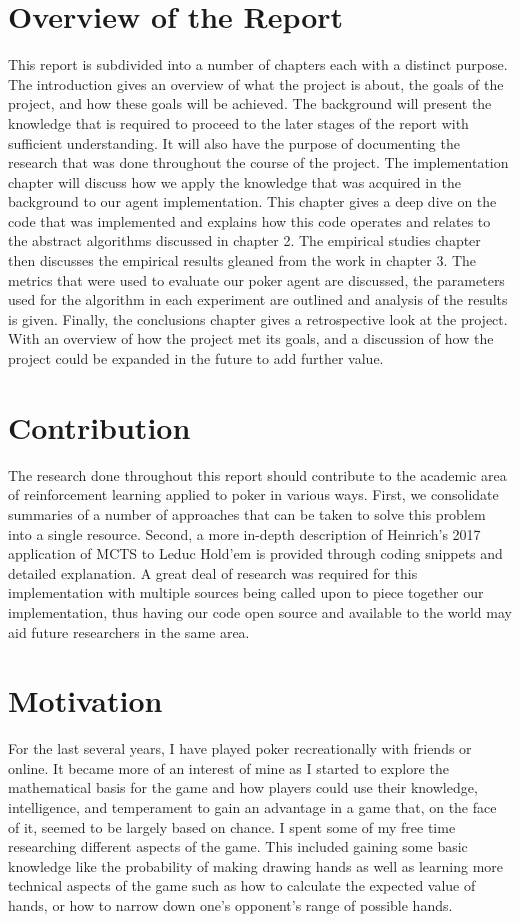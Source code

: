 \section{Overview of the Report}\label{sec:reportOverview}
This report is subdivided into a number of chapters each with a distinct purpose.
The introduction gives an overview of what the project is about, the goals of the project, and how
these goals will be achieved.
The background will present the knowledge that is required to proceed to the
later stages of the report with sufficient understanding.
It will also have the purpose of documenting the research that was done throughout the course of the project.
The implementation chapter will discuss how we apply the knowledge that was acquired in the
background to our agent implementation.
This chapter gives a deep dive on the code that was implemented and explains how this code operates
and relates to the abstract algorithms discussed in chapter 2.
The empirical studies chapter then discusses the empirical results gleaned from the work in chapter 3.
The metrics that were used to evaluate our poker agent are discussed, the parameters used for the algorithm
in each experiment are outlined and analysis of the results is given.
Finally, the conclusions chapter gives a retrospective look at the project.
With an overview of how the project met its goals, and a discussion of how the project could be
expanded in the future to add further value.

\section{Contribution}\label{sec:contribution}
The research done throughout this report should contribute to the academic area of reinforcement
learning applied to poker in various ways.
First, we consolidate summaries of a number of approaches that can be taken to solve this problem into a single
resource.
Second, a more in-depth description of Heinrich's 2017 application of MCTS to Leduc Hold'em is
provided through coding snippets and detailed explanation.
A great deal of research was required for this implementation with multiple sources being called
upon to piece together our implementation, thus having our code
open source and available to the world may aid future researchers in the same area.

\section{Motivation}\label{sec:Motivation}
For the last several years, I have played poker recreationally with friends or online.
It became more of an interest of mine as I started to explore the mathematical basis for the game and how
players could use their knowledge, intelligence, and temperament to gain an advantage in a game that,
on the face of it, seemed to be largely based on chance.
I spent some of my free time researching different aspects of the game.
This included gaining some basic knowledge like the probability of making drawing hands as well as learning more
technical aspects of the game such as how to calculate the expected value of hands,
or how to narrow down one's opponent's range of possible hands.

